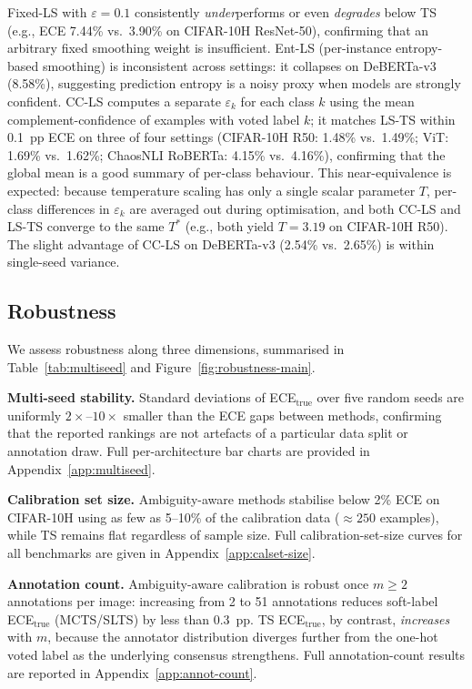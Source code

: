 \documentclass[10pt,journal,compsoc]{IEEEtran}
\begin{document}
Fixed-LS with $\varepsilon{=}0.1$ consistently \emph{under}performs or even \emph{degrades} below TS (e.g., ECE 7.44\% vs.\ 3.90\% on CIFAR-10H ResNet-50), confirming that an arbitrary fixed smoothing weight is insufficient.  Ent-LS (per-instance entropy-based smoothing) is inconsistent across settings: it collapses on DeBERTa-v3 (8.58\%), suggesting prediction entropy is a noisy proxy when models are strongly confident.  CC-LS computes a separate $\varepsilon_k$ for each class $k$ using the mean complement-confidence of examples with voted label $k$; it matches LS-TS within 0.1~pp ECE on three of four settings (CIFAR-10H R50: 1.48\% vs.\ 1.49\%; ViT: 1.69\% vs.\ 1.62\%; ChaosNLI RoBERTa: 4.15\% vs.\ 4.16\%), confirming that the global mean is a good summary of per-class behaviour.  This near-equivalence is expected: because temperature scaling has only a single scalar parameter $T$, per-class differences in $\varepsilon_k$ are averaged out during optimisation, and both CC-LS and LS-TS converge to the same $T^*$ (e.g., both yield $T{=}3.19$ on CIFAR-10H R50).  The slight advantage of CC-LS on DeBERTa-v3 (2.54\% vs.\ 2.65\%) is within single-seed variance.

\subsection{Robustness}
\label{sec:robustness}

We assess robustness along three dimensions, summarised in Table~\ref{tab:multiseed} and Figure~\ref{fig:robustness-main}.

\noindent\textbf{Multi-seed stability.}
Standard deviations of ECE$_\text{true}$ over five random seeds are uniformly $2{\times}$--$10{\times}$ smaller than the ECE gaps between methods, confirming that the reported rankings are not artefacts of a particular data split or annotation draw.  Full per-architecture bar charts are provided in Appendix~\ref{app:multiseed}.

\noindent\textbf{Calibration set size.}
Ambiguity-aware methods stabilise below 2\% ECE on CIFAR-10H using as few as 5--10\% of the calibration data (${\approx}250$ examples), while TS remains flat regardless of sample size.  Full calibration-set-size curves for all benchmarks are given in Appendix~\ref{app:calset-size}.

\noindent\textbf{Annotation count.}
Ambiguity-aware calibration is robust once $m\geq 2$ annotations per image: increasing from 2 to 51 annotations reduces soft-label ECE$_\text{true}$ (MCTS/SLTS) by less than 0.3~pp.  TS ECE$_\text{true}$, by contrast, \emph{increases} with $m$, because the annotator distribution diverges further from the one-hot voted label as the underlying consensus strengthens.  Full annotation-count results are reported in Appendix~\ref{app:annot-count}.
\end{document}
